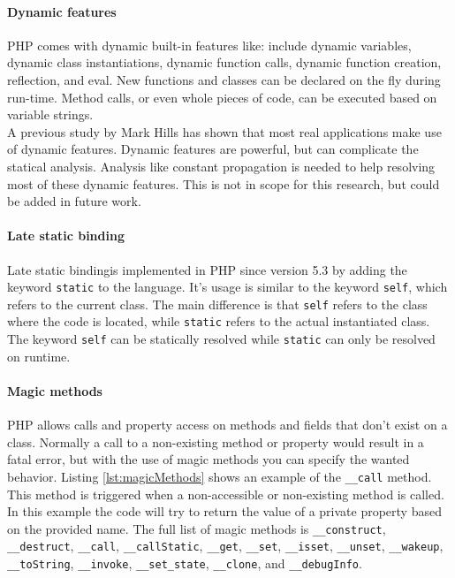 \documentclass[../main.tex]{subfiles}
\begin{document}
    
    \paragraph{Dynamic features}
    PHP comes with dynamic built-in features like: include dynamic variables, dynamic class instantiations, dynamic function calls, dynamic function creation, reflection, and eval.
    New functions and classes can be declared on the fly during run-time.
    Method calls, or even whole pieces of code, can be executed based on variable strings.
    \\
    A previous study by Mark Hills\cite{Hil:13} has shown that most real applications make use of dynamic features.
    Dynamic features are powerful, but can complicate the statical analysis.
    Analysis like constant propagation is needed to help resolving most of these dynamic features.
    This is not in scope for this research, but could be added in future work.
    
    \paragraph{Late static binding}
    Late static binding\footnotemark is implemented in PHP since version 5.3 by adding the keyword \texttt{static} to the language.
    It's usage is similar to the keyword \texttt{self}, which refers to the current class. 
    The main difference is that \texttt{self} refers to the class where the code is located, while \texttt{static} refers to the actual instantiated class.
    The keyword \texttt{self} can be statically resolved while \texttt{static} can only be resolved on runtime.
    
    \paragraph{Magic methods}
    PHP allows calls and property access on methods and fields that don't exist on a class.
    Normally a call to a non-existing method or property would result in a fatal error, but with the use of magic methods you can specify the wanted behavior.
    Listing \ref{lst:magicMethods} shows an example of the \texttt{\_\_{}call} method.
    This method is triggered when a non-accessible or non-existing method is called.
    In this example the code will try to return the value of a private property based on the provided name.
    The full list of magic methods is \texttt{\_\_{}construct}, \texttt{\_\_{}destruct}, \texttt{\_\_{}call}, \texttt{\_\_{}callStatic}, \texttt{\_\_{}get}, \texttt{\_\_{}set}, \texttt{\_\_{}isset}, \texttt{\_\_{}unset}, \texttt{\_\_{}wakeup}, \texttt{\_\_{}toString}, \texttt{\_\_{}invoke}, \texttt{\_\_{}set\_state}, \texttt{\_\_{}clone}, and \texttt{\_\_{}debugInfo}.
	
\end{document}
